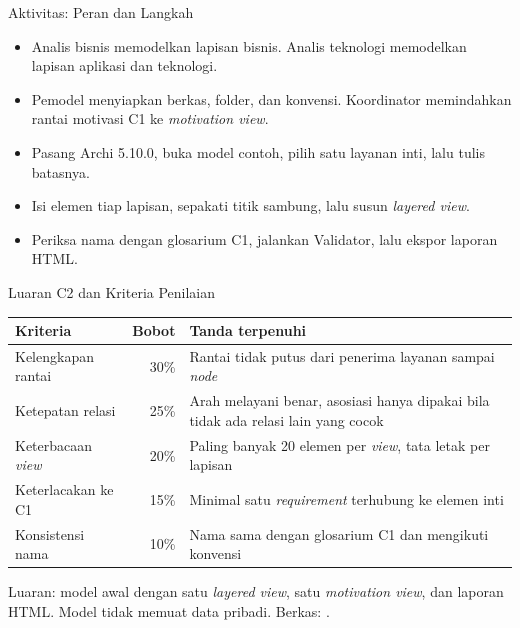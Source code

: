 \documentclass[aspectratio=169, table, 12pt]{beamer}
\begin{document}
\begin{frame}{{\Large Aktivitas: Peran dan Langkah}}
  \vspace{6pt}
  \small
  \begin{itemize}
    \item Analis bisnis memodelkan lapisan bisnis. Analis teknologi memodelkan lapisan aplikasi dan
          teknologi.
    \item Pemodel menyiapkan berkas, folder, dan konvensi. Koordinator memindahkan rantai motivasi C1 ke
          \textit{motivation view}.
    \item Pasang Archi 5.10.0, buka model contoh, pilih satu layanan inti, lalu tulis batasnya.
    \item Isi elemen tiap lapisan, sepakati titik sambung, lalu susun \textit{layered view}.
    \item Periksa nama dengan glosarium C1, jalankan Validator, lalu ekspor laporan HTML.
  \end{itemize}
\end{frame}

\begin{frame}{{\Large Luaran C2 dan Kriteria Penilaian}}
  \footnotesize
  \begin{tabularx}{\textwidth}{>{\raggedright\arraybackslash}p{4.0cm} r
      >{\raggedright\arraybackslash}X}
    \hline
    \textbf{Kriteria} & \textbf{Bobot} & \textbf{Tanda terpenuhi} \\
    \hline
    Kelengkapan rantai & 30\% & Rantai tidak putus dari penerima layanan sampai \textit{node} \\
    \hline
    Ketepatan relasi & 25\% & Arah melayani benar, asosiasi hanya dipakai bila tidak ada relasi lain yang cocok \\
    \hline
    Keterbacaan \textit{view} & 20\% & Paling banyak 20 elemen per \textit{view}, tata letak per lapisan \\
    \hline
    Keterlacakan ke C1 & 15\% & Minimal satu \textit{requirement} terhubung ke elemen inti \\
    \hline
    Konsistensi nama & 10\% & Nama sama dengan glosarium C1 dan mengikuti konvensi \\
    \hline
  \end{tabularx}

  \vspace{6pt}
  \small Luaran: model awal dengan satu \textit{layered view}, satu \textit{motivation view}, dan laporan
  HTML. Model tidak memuat data pribadi. Berkas: .
\end{frame}
\end{document}

